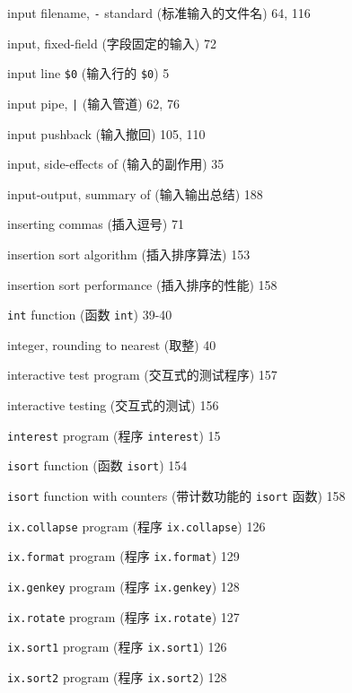 \begin{multicols}{3}
\hangindent=3pc  input filename, \verb'-' standard
(标准输入的文件名) 64, 116

\hangindent=3pc  input, fixed-field (字段固定的输入) 72

\hangindent=3pc  input line \verb'$0' (输入行的 \verb'$0') 5

\hangindent=3pc  input pipe, \verb'|' (输入管道) 62, 76

\hangindent=3pc  input pushback (输入撤回) 105, 110

\hangindent=3pc  input, side-effects of (输入的副作用) 35

\hangindent=3pc  input-output, summary of (输入输出总结) 188

\hangindent=3pc  inserting commas (插入逗号) 71

\hangindent=3pc  insertion sort algorithm (插入排序算法) 153

\hangindent=3pc  insertion sort performance (插入排序的性能) 158

\hangindent=3pc  \verb'int' function (函数 \verb'int') 39-40

\hangindent=3pc  integer, rounding to nearest (取整) 40

\hangindent=3pc  interactive test program (交互式的测试程序) 157

\hangindent=3pc  interactive testing (交互式的测试) 156

\hangindent=3pc  \verb'interest' program (程序 \verb'interest') 15 

\hangindent=3pc  \verb'isort' function (函数 \verb'isort') 154

\hangindent=3pc  \verb'isort' function with counters
(带计数功能的 \verb'isort' 函数) 158

\hangindent=3pc  \verb'ix.collapse' program (程序
\verb'ix.collapse') 126

\hangindent=3pc  \verb'ix.format' program (程序
\verb'ix.format') 129 

\hangindent=3pc  \verb'ix.genkey' program (程序
\verb'ix.genkey') 128 

\hangindent=3pc  \verb'ix.rotate' program (程序
\verb'ix.rotate') 127 

\hangindent=3pc  \verb'ix.sort1' program (程序 \verb'ix.sort1') 126

\hangindent=3pc  \verb'ix.sort2' program (程序 \verb'ix.sort2') 128 


\end{multicols}
